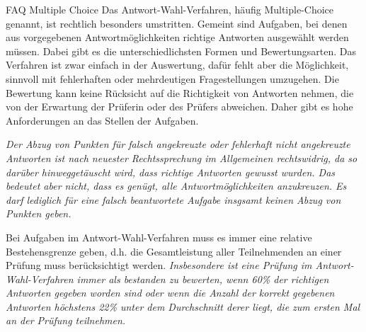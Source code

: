 \begin{artikel}{FAQ Multiple Choice}
Das Antwort-Wahl-Verfahren, häufig Multiple-Choice genannt, ist rechtlich besonders umstritten. Gemeint sind Aufgaben, bei denen aus vorgegebenen Antwortmöglichkeiten richtige Antworten ausgewählt werden müssen. Dabei gibt es die unterschiedlichsten Formen und Bewertungsarten. Das Verfahren ist zwar einfach in der Auswertung, dafür fehlt aber die Möglichkeit, sinnvoll mit fehlerhaften oder mehrdeutigen Fragestellungen umzugehen. Die Bewertung kann keine Rücksicht auf die Richtigkeit von Antworten nehmen, die von der Erwartung der Prüferin oder des Prüfers abweichen. Daher gibt es hohe Anforderungen an das Stellen der Aufgaben.

\textit{Der Abzug von Punkten für falsch angekreuzte oder fehlerhaft nicht angekreuzte Antworten ist nach neuester Rechtssprechung im Allgemeinen rechtswidrig, da so darüber hinweggetäuscht wird, dass richtige Antworten gewusst wurden. Das bedeutet aber nicht, dass es genügt, alle Antwortmöglichkeiten anzukreuzen. Es darf lediglich für eine falsch beantwortete Aufgabe insgsamt keinen Abzug von Punkten geben.}

Bei Aufgaben im Antwort-Wahl-Verfahren muss es immer eine relative Bestehensgrenze geben, d.h. die Gesamtleistung aller Teilnehmenden an einer Prüfung muss berücksichtigt werden. \textit{Insbesondere ist eine Prüfung im Antwort-Wahl-Verfahren immer als bestanden zu bewerten, wenn 60\% der richtigen Antworten gegeben worden sind oder wenn die Anzahl der korrekt gegebenen Antworten höchstens 22\% unter dem Durchschnitt derer liegt, die zum ersten Mal an der Prüfung teilnehmen.}
\end{artikel}
